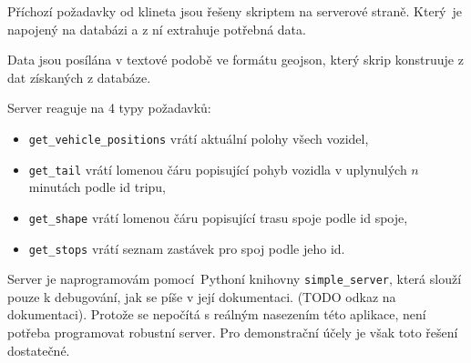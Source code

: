 Příchozí požadavky od klineta jsou řešeny skriptem na serverové straně. Který je napojený na databázi a z ní extrahuje potřebná data.

\bigbreak

Data jsou posílána v textové podobě ve formátu \gls{geojson}, který skrip konstruuje z dat získaných z databáze.

\bigbreak

Server reaguje na 4 typy požadavků:

\begin{itemize}
	\item \verb-get_vehicle_positions- vrátí aktuální polohy všech vozidel,

	\item \verb-get_tail- vrátí lomenou čáru popisující pohyb vozidla v uplynulých $n$ minutách podle id tripu,

	\item \verb-get_shape- vrátí lomenou čáru popisující trasu spoje podle id spoje,

	\item \verb-get_stops- vrátí seznam zastávek pro spoj podle jeho id.
\end{itemize}

\bigbreak

Server je naprogramovám pomocí Pythoní knihovny \verb-simple_server-, která slouží pouze k debugování, jak se píše v její dokumentaci. (TODO odkaz na dokumentaci). Protože se nepočítá s reálným nasezením této aplikace, není potřeba programovat robustní server. Pro demonstrační účely je však toto řešení dostatečné.























